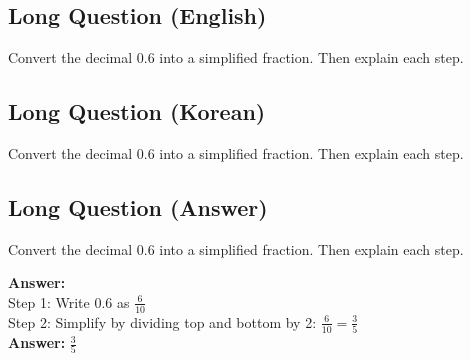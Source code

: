 \cleardoublepage
\subsection*{Long Question (English)}
Convert the decimal 0.6 into a simplified fraction. Then explain each step.


\newpage
\subsection*{Long Question (Korean)}
Convert the decimal 0.6 into a simplified fraction. Then explain each step.


\newpage
\subsection*{Long Question (Answer)}
Convert the decimal 0.6 into a simplified fraction. Then explain each step.

\textbf{Answer:}\\
Step 1: Write 0.6 as $\frac{6}{10}$\\
Step 2: Simplify by dividing top and bottom by 2: $\frac{6}{10} = \frac{3}{5}$\\
\textbf{Answer:} $\frac{3}{5}$
